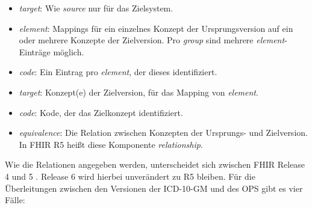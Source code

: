 \begin{itemize}
\item \emph{target}: Wie \emph{source} nur für das Zielsystem. %
\item \emph{element}: Mappings für ein einzelnes Konzept der Ursprungsversion auf ein oder mehrere Konzepte der Zielversion. Pro \emph{group} sind mehrere \emph{element}-Einträge möglich. %
\item \emph{code}: Ein Eintrag pro \emph{element}, der dieses identifiziert. %
\item \emph{target}: Konzept(e) der Zielversion, für das Mapping von \emph{element}. %
\item \emph{code}: Kode, der das Zielkonzept identifiziert. %
\item \emph{equivalence}: Die Relation zwischen Konzepten der Ursprungs- und Zielversion. In FHIR R5 heißt diese Komponente \emph{relationship}. %
\end{itemize}

Wie die Relationen angegeben werden, unterscheidet sich zwischen FHIR Release 4 und 5 \cite{conceptmap-r5}. Release 6 wird hierbei unverändert zu R5 bleiben. Für die Überleitungen zwischen den Versionen der ICD-10-GM und des OPS gibt es vier Fälle: 

